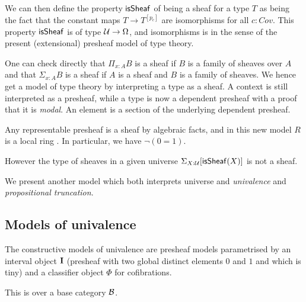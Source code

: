     We can then define the property $\mathsf{isSheaf}$ of being a sheaf for a type $T$ as being the fact that
    the constant maps $T\rightarrow T^{[p_c]}$ are isomorphisms for all $c:Cov$.  This property $\mathsf{isSheaf}$ is of type
    $\mathcal{U}\rightarrow\Omega$, and isomorphisms is in the sense of the present (extensional) presheaf model of type theory.

    \medskip

    One can check directly that $\Pi_{x:A}B$ is a sheaf if $B$ is a family of sheaves over $A$
    and that $\Sigma_{x:A}B$ is a sheaf if $A$ is a sheaf and $B$ is a family of sheaves. We hence get a model of type theory
    by interpreting a type as a sheaf. A context is still interpreted as a presheaf, while a type is now a dependent presheaf
    with a proof that it is {\em modal}. An element is a section of the underlying dependent presheaf.
    
    \medskip

    Any representable presheaf is a sheaf by algebraic facts, and in this new model $R$ is a local ring
    .
    In particular, we have $\neg (0 = 1)$.
    
    \medskip

    However the type of sheaves in a given universe $\Sigma_{X:\mathcal{U}}[\mathsf{isSheaf}(X)]$ is not a sheaf.

    We present another model which both interprets universe and {\em univalence} and {\em propositional truncation}.

\subsection{Models of univalence}

The constructive models of univalence are presheaf models parametrised by an interval object $\mathbf{I}$
(presheaf with two global distinct elements $0$ and $1$ and which is tiny) and a classifier object
$\Phi$ for cofibrations.

 This is over a base category $\mathcal{B}$.
 
